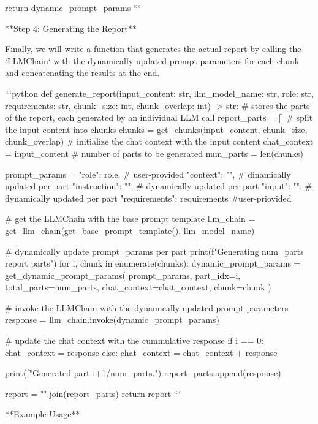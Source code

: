 {{    return dynamic_prompt_params
```


**Step 4: Generating the Report**

Finally, we will write a function that generates the actual report by calling the `LLMChain` with the dynamically updated prompt parameters for each chunk and concatenating the results at the end.


```python
def generate_report(input_content: str, llm_model_name: str, 
                    role: str, requirements: str,
                    chunk_size: int, chunk_overlap: int) -> str:
    # stores the parts of the report, each generated by an individual LLM call
    report_parts = [] 
    # split the input content into chunks
    chunks = get_chunks(input_content, chunk_size, chunk_overlap)
    # initialize the chat context with the input content
    chat_context = input_content
    # number of parts to be generated
    num_parts = len(chunks)

    prompt_params = {
        "role": role, # user-provided
        "context": "", # dinamically updated per part
        "instruction": "", # dynamically updated per part
        "input": "", # dynamically updated per part
        "requirements": requirements #user-priovided
    }

    # get the LLMChain with the base prompt template
    llm_chain = get_llm_chain(get_base_prompt_template(), 
                                 llm_model_name)

    # dynamically update prompt_params per part
    print(f"Generating {num_parts} report parts")
    for i, chunk in enumerate(chunks):
        dynamic_prompt_params = get_dynamic_prompt_params(
            prompt_params,
            part_idx=i,
            total_parts=num_parts,
            chat_context=chat_context,
            chunk=chunk
        )
        
        # invoke the LLMChain with the dynamically updated prompt parameters
        response = llm_chain.invoke(dynamic_prompt_params)

        # update the chat context with the cummulative response
        if i == 0:
            chat_context = response
        else:
            chat_context = chat_context + response
            
        print(f"Generated part {i+1}/{num_parts}.")
        report_parts.append(response)

    report = "\n".join(report_parts)
    return report
```

**Example Usage**



}}
